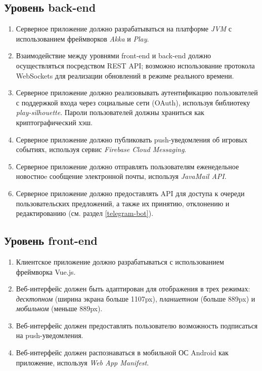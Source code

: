 \documentclass[12pt, a4paper]{article}
\begin{document}
\subsection{Уровень back-end}

\begin{enumerate}
\item Серверное приложение должно разрабатываться на платформе \textit{JVM}
с использованием фреймворков \textit{Akka} и \textit{Play}.
\item Взаимодействие между уровнями front-end и back-end должно осуществляться
посредством REST API; возможно использование протокола WebSockets для реализации
обновлений в режиме реального времени.
\item Серверное приложение должно реализовывать аутентификацию пользователей
с поддержкой входа через социальные сети (OAuth), используя библиотеку
\textit{play-silhouette}. Пароли пользователей должны храниться как
криптографический хэш.
\item Серверное приложение должно публиковать push-уведомления об игровых событиях,
используя сервис \textit{Firebase Cloud Messaging}.
\item Серверное приложение должно отправлять пользователям еженедельное новостноe
сообщение электронной почты, используя \textit{JavaMail API}.
\item Серверное приложение должно предоставлять API для доступа к очереди
пользовательских предложений, а также их принятию, отклонению и редактированию
(см. раздел \ref{telegram-bot}).
\end{enumerate}

\subsection{Уровень front-end}

\begin{enumerate}
\item Клиентское приложение должно разрабатываться с использованием фреймворка Vue.js.
\item Веб-интерфейс должен быть адаптирован для отображения в трех режимах:
\textit{десктопном} (ширина экрана больше 1107px),
\textit{планшетном} (больше 889px) и \textit{мобильном} (меньше 889px).
\item Веб-интерфейс должен предоставлять пользователю возможность подписаться на
push-уведомления.
\item Веб-интерфейс должен распознаваться в мобильной ОС Android как
приложение, используя \textit{Web App Manifest}.
\end{enumerate}
\end{document}
